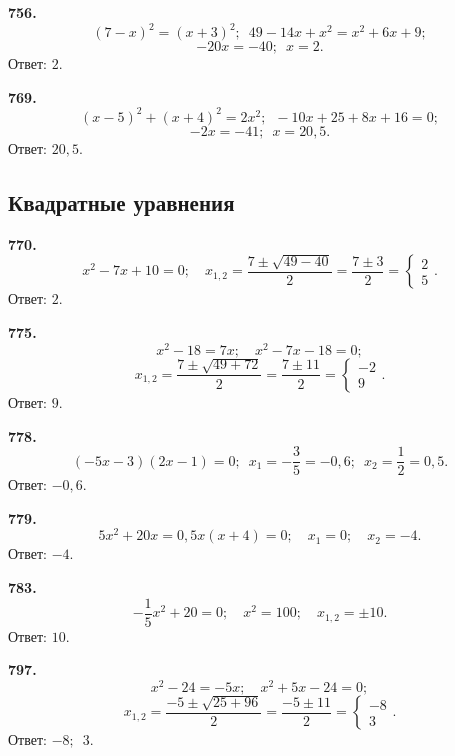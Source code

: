 \textbf{756.} $$\left(7-x\right)^2=\left(x+3\right)^2;\enspace 49-14x+x^2=x^2+6x+9;$$$$ -20x=-40;\enspace x=2.$$ \newline \null \hspace*{\fill} Ответ: $2$.    

\textbf{769.} $$\left(x-5\right)^2+\left(x+4\right)^2=2x^2;\enspace -10x+25+8x+16=0;$$$$ -2x=-41;\enspace x=20,5.$$ \newline \null \hspace*{\fill} Ответ: $20,5$.    

\subsection{Квадратные уравнения}


\textbf{770.} $$x^2-7x+10=0;\quad x_{1,2}=\frac{7\pm\sqrt{49-40}}{2}=\frac{7\pm3}{2}=\begin{cases}2 \\5 \end{cases}.$$ \newline \null \hspace*{\fill} Ответ: $2$.  

\newpage\textbf{775.} $$x^2-18=7x;\quad x^2-7x-18=0;$$$$ x_{1,2}=\frac{7\pm\sqrt{49+72}}{2}=\frac{7\pm11}{2}=\begin{cases}-2 \\9 \end{cases}.$$ \newline \null \hspace*{\fill} Ответ: $9$. 

\textbf{778.} $$(-5x-3)(2x-1)=0;\enspace x_1=-\frac{3}{5}=-0,6;\enspace x_2=\frac{1}{2}=0,5.$$ \newline \null \hspace*{\fill} Ответ: $-0,6$. 

\textbf{779.} $$5x^2+20x=0,5x(x+4)=0;\quad x_1=0;\quad x_2=-4.$$ \newline \null \hspace*{\fill} Ответ: $-4$. 

\textbf{783.} $$-\frac{1}{5}x^2+20=0;\quad x^2=100;\quad x_{1,2}=\pm10.$$ \newline \null \hspace*{\fill} Ответ: $10$. 

\textbf{797.} $$x^2-24=-5x;\quad x^2+5x-24=0;$$$$ x_{1,2}=\frac{-5\pm\sqrt{25+96}}{2}=\frac{-5\pm11}{2}=\begin{cases}-8 \\3 \end{cases}.$$ \newline \null \hspace*{\fill} Ответ: $-8;\enspace3$. 

